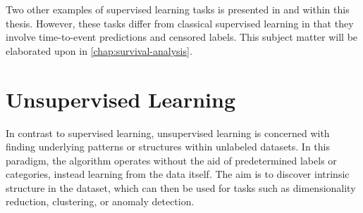 Two other examples of supervised learning tasks is presented in 
\studyii{} and \studyiii{} within this thesis.
However, these tasks differ from classical supervised learning
in that they involve time-to-event predictions and censored labels.
This subject matter will be elaborated upon in \cref{chap:survival-analysis}.

\section{Unsupervised Learning}

In contrast to supervised learning,
unsupervised learning is concerned with finding 
underlying patterns or structures within unlabeled datasets. 
In this paradigm, the algorithm operates without the aid of 
predetermined labels or categories, instead learning from the data itself. 
The aim is to discover intrinsic structure in the dataset, 
which can then be used for tasks such as 
dimensionality reduction, clustering, or anomaly detection.

